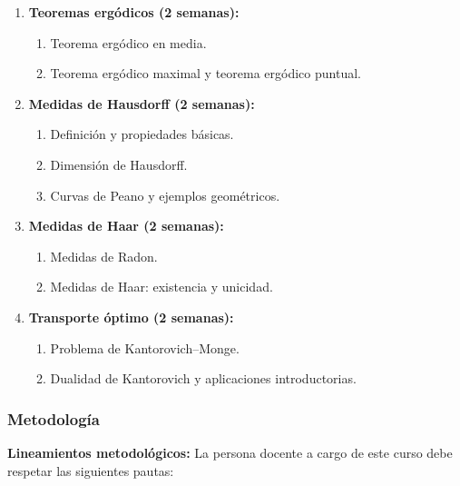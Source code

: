 \begin{refsection}
\begin{enumerate}
\item \textbf{Teoremas ergódicos (2 semanas):}
\begin{enumerate}
    \item Teorema ergódico en media.
    \item Teorema ergódico maximal y teorema ergódico puntual.
\end{enumerate}

\item \textbf{Medidas de Hausdorff (2 semanas):}
\begin{enumerate}
    \item Definición y propiedades básicas.
    \item Dimensión de Hausdorff.
    \item Curvas de Peano y ejemplos geométricos.
\end{enumerate}

\item \textbf{Medidas de Haar (2 semanas):}
\begin{enumerate}
    \item Medidas de Radon.
    \item Medidas de Haar: existencia y unicidad.
\end{enumerate}

\item \textbf{Transporte óptimo (2 semanas):}
\begin{enumerate}
    \item Problema de Kantorovich--Monge.
    \item Dualidad de Kantorovich y aplicaciones introductorias.
\end{enumerate}

\end{enumerate}

\subsubsection*{Metodología}

\noindent \textbf{Lineamientos metodológicos:} La persona docente a cargo de este curso debe respetar las siguientes pautas:


\end{refsection}
